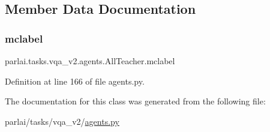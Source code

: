 \subsection{Member Data Documentation}
\mbox{\label{classparlai_1_1tasks_1_1vqa__v2_1_1agents_1_1AllTeacher_a4da023a0162581d4364ccaafafb001d6}} 
\subsubsection{\texorpdfstring{mclabel}{mclabel}}
{\footnotesize\ttfamily parlai.\+tasks.\+vqa\+\_\+v2.\+agents.\+All\+Teacher.\+mclabel}



Definition at line 166 of file agents.\+py.



The documentation for this class was generated from the following file\+:\begin{DoxyCompactItemize}
\item 
parlai/tasks/vqa\+\_\+v2/\hyperlink{parlai_2tasks_2vqa__v2_2agents_8py}{agents.\+py}\end{DoxyCompactItemize}
